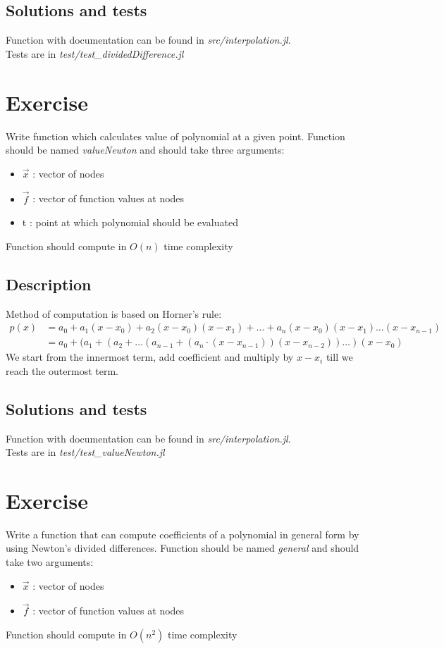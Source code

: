 \documentclass[11pt]{article}
\begin{document}
\subsection*{Solutions and tests}
Function with documentation can be found in \textit{src/interpolation.jl}. \\
Tests are in \textit{test/test\_dividedDifference.jl}

\section{Exercise}
Write function which calculates value of polynomial at a given point.
Function should be named \textit{valueNewton} and should take three arguments: 
\begin{itemize}
    \item $\vec{x}$ : vector of nodes
    \item $\vec{f}$ : vector of function values at nodes
    \item t : point at which polynomial should be evaluated
\end{itemize}
Function should compute in $O(n)$ time complexity
\subsection*{Description}
Method of computation is based on Horner's rule:
\begin{equation*}
\begin{split}
    p(x) &= a_0 + a_1(x-x_0) + a_2(x-x_0)(x-x_1) + \dots + a_n(x-x_0)(x-x_1)\dots(x-x_{n-1})\\
     &= a_0 + (a_1 + (a_2 + \dots (a_{n-1} + (a_n \cdot (x-x_{n-1}))(x-x_{n-2}))\dots)(x-x_0)
\end{split}
\end{equation*}
We start from the innermost term, add coefficient and multiply by ${x-x_i}$ till we reach the outermost term.
\subsection*{Solutions and tests}
Function with documentation can be found in \textit{src/interpolation.jl}.\\
Tests are in \textit{test/test\_valueNewton.jl}
\section{Exercise}
Write a function that can compute coefficients of a polynomial in general form by using Newton's divided differences.
Function should be named \textit{general} and should take two arguments:
\begin{itemize}
    \item $\vec{x}$ : vector of nodes
    \item $\vec{f}$ : vector of function values at nodes
\end{itemize}
Function should compute in $O(n^2)$ time complexity
\end{document}
